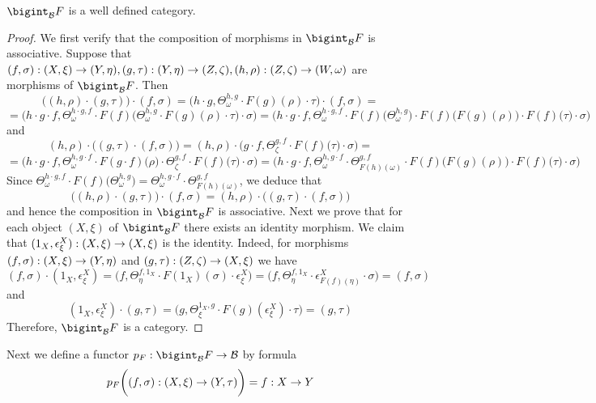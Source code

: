 \begin{fact}
$\bigint_{\cB}F$ is a well defined category.
\end{fact}
\begin{proof}
We first verify that the composition of morphisms in $\bigint_{\cB}F$ is associative. Suppose that $(f,\sigma):(X,\xi)\rightarrow (Y,\eta),(g,\tau):(Y,\eta)\rightarrow (Z,\zeta),(h,\rho):(Z,\zeta)\rightarrow (W,\omega)$ are morphisms of $\bigint_{\cB}F$. Then
$$\big((h,\rho)\cdot (g,\tau)\big)\cdot (f,\sigma) = \big(h\cdot g,\Theta^{h,g}_{\omega}\cdot F(g)\left(\rho\right)\cdot \tau\big)\cdot (f,\sigma) = $$
$$ = \bigg(h\cdot g\cdot f,\Theta^{h\cdot g,f}_{\omega}\cdot F(f)\big(\Theta^{h,g}_{\omega}\cdot F(g)\left(\rho\right)\cdot \tau \big)\cdot \sigma\bigg) = \bigg(h\cdot g\cdot f,\Theta^{h\cdot g,f}_{\omega}\cdot F(f)\big(\Theta^{h,g}_{\omega}\big)\cdot F(f)\big(F(g)\left(\rho\right)\big)\cdot F(f)\big(\tau\big)\cdot \sigma \bigg)$$
and
$$(h,\rho)\cdot \big((g,\tau) \cdot (f,\sigma) \big) = (h, \rho)\cdot \bigg(g\cdot f, \Theta^{g,f}_{\zeta}\cdot F(f)\big(\tau\big)\cdot \sigma\bigg) = $$
$$ = \big(h\cdot g\cdot f, \Theta^{h, g\cdot f}_{\omega}\cdot F(g\cdot f)\big(\rho\big)\cdot \Theta^{g,f}_{\zeta}\cdot F(f)\big(\tau\big)\cdot \sigma \big) = \big(h\cdot g\cdot f, \Theta^{h, g\cdot f}_{\omega}\cdot  \Theta^{g,f}_{F(h)(\omega)} \cdot F(f)\big(F(g)\left(\rho\right)\big)\cdot F(f)\big(\tau\big)\cdot \sigma \big)$$
Since $\Theta^{h\cdot g,f}_{\omega}\cdot F(f)\big(\Theta^{h,g}_{\omega}\big) = \Theta^{h, g\cdot f}_{\omega}\cdot  \Theta^{g,f}_{F(h)(\omega)}$, we deduce that
$$\big((h,\rho)\cdot (g,\tau)\big)\cdot (f,\sigma) = (h,\rho)\cdot \big((g,\tau) \cdot (f,\sigma) \big)$$
and hence the composition in $\bigint_{\cB}F$ is associative. Next we prove that for each object $(X,\xi)$ of $\bigint_{\cB}F$ there exists an identity morphism. We claim that $(1_X,\epsilon^X_{\xi}):(X,\xi)\rightarrow (X,\xi)$ is the identity. Indeed, for morphisms $(f,\sigma):(X,\xi)\rightarrow (Y,\eta)$ and $(g,\tau):(Z,\zeta)\rightarrow (X,\xi)$ we have
$$(f,\sigma) \cdot (1_X,\epsilon^X_{\xi}) = \big(f,\Theta^{f,1_X}_{\eta}\cdot F(1_X)\left(\sigma \right)\cdot \epsilon^X_{\xi}\big) =  \big(f,\Theta^{f,1_X}_{\eta}\cdot \epsilon^X_{F(f)(\eta)}\cdot \sigma\big) = (f,\sigma)$$
and
$$(1_X,\epsilon^X_{\xi}) \cdot (g,\tau) = \big(g,\Theta^{1_X,g}_{\xi} \cdot F(g)\left(\epsilon^X_{\xi}\right)\cdot \tau \big) = (g,\tau)$$
Therefore, $\bigint_{\cB}F$ is a category.
\end{proof}
\noindent
Next we define a functor $p_F:\bigint_{\cB}F\ra \cB$ by formula
$$p_F\bigg((f,\sigma):(X,\xi)\rightarrow (Y,\tau)\bigg) = f:X\rightarrow Y$$
